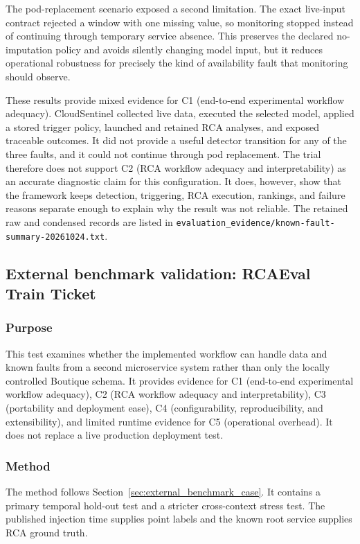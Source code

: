 The pod-replacement scenario exposed a second limitation. The exact live-input contract rejected a window with one missing value, so monitoring stopped instead of continuing through temporary service absence. This preserves the declared no-imputation policy and avoids silently changing model input, but it reduces operational robustness for precisely the kind of availability fault that monitoring should observe.

These results provide mixed evidence for C1 (end-to-end experimental workflow adequacy). CloudSentinel collected live data, executed the selected model, applied a stored trigger policy, launched and retained RCA analyses, and exposed traceable outcomes. It did not provide a useful detector transition for any of the three faults, and it could not continue through pod replacement. The trial therefore does not support C2 (RCA workflow adequacy and interpretability) as an accurate diagnostic claim for this configuration. It does, however, show that the framework keeps detection, triggering, RCA execution, rankings, and failure reasons separate enough to explain why the result was not reliable. The retained raw and condensed records are listed in \texttt{evaluation\_evidence/known-fault-summary-20261024.txt}.

\subsection{External benchmark validation: RCAEval Train Ticket}

\subsubsection{Purpose}

This test examines whether the implemented workflow can handle data and known faults from a second microservice system rather than only the locally controlled Boutique schema. It provides evidence for C1 (end-to-end experimental workflow adequacy), C2 (RCA workflow adequacy and interpretability), C3 (portability and deployment ease), C4 (configurability, reproducibility, and extensibility), and limited runtime evidence for C5 (operational overhead). It does not replace a live production deployment test.

\subsubsection{Method}

The method follows Section~\ref{sec:external_benchmark_case}. It contains a primary temporal hold-out test and a stricter cross-context stress test. The published injection time supplies point labels and the known root service supplies RCA ground truth.

